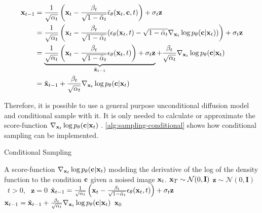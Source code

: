 \begin{equation}
   \begin{aligned}
      \mathbf{x}_{t-1} &= \frac{1}{\sqrt{\alpha_t}} \left(\mathbf{x}_t - \frac{\beta_t}{\sqrt{1 - \bar{\alpha}_t}} \bar{\epsilon}_\theta(\mathbf{x}_t, \mathbf{c}, t) \right) + \sigma_t \mathbf{z} \\
      &= \frac{1}{\sqrt{\alpha_t}} \left(\mathbf{x}_t - \frac{\beta_t}{\sqrt{1 - \bar{\alpha}_t}} (\epsilon_\theta(\mathbf{x}_t, t) - \sqrt{1 - \bar{\alpha}_t} \nabla_{\mathbf{x}_t} \log p_\theta(\mathbf{c}|\mathbf{x}_t)) \right) + \sigma_t \mathbf{z} \\
      &= \underbrace{\frac{1}{\sqrt{\alpha_t}} \left(\mathbf{x}_t - \frac{\beta_t}{\sqrt{1 - \bar{\alpha}_t}} \epsilon_\theta(\mathbf{x}_t, t) \right) + \sigma_t \mathbf{z}}_{\tilde{\mathbf{x}}_{t-1}} + \frac{\beta_t}{\sqrt{\alpha_t}} \nabla_{\mathbf{x}_t} \log p_\theta(\mathbf{c}|\mathbf{x}_t) \\
      &= \tilde{\mathbf{x}}_{t-1} + \frac{\beta_t}{\sqrt{\alpha_t}} \nabla_{\mathbf{x}_t} \log p_\theta(\mathbf{c}|\mathbf{x}_t) \\
   \end{aligned}
\end{equation}

Therefore, it is possible to use a general purpose unconditional diffusion model and conditional sample with it.
It is only needed to calculate or approximate the score-function $\nabla_{\mathbf{x}_t} \log p_\theta(\mathbf{c}|\mathbf{x}_t)$ \parencite{diffusion-beats-gans}.
\autoref{alg:sampling-conditional} shows how conditional sampling can be implemented.

\begin{algorithm}[htp!]
   \caption{Conditional Sampling}
   \label{alg:sampling-conditional}
   \begin{algorithmic}
      \Require A score-function $\nabla_{\mathbf{x}_t} \log p_\theta(\mathbf{c}|\mathbf{x}_t)$ modeling the derivative of the log of the density function to the condition $\mathbf{c}$ given a noised image $\mathbf{x}_t$.
      \State $\mathbf{x}_T \sim \mathcal{N}(0, \mathbf{I})$
      \State $\mathbf{z} \sim \mathcal{N}(0, \mathbf{I})$ \algorithmicif\ $t > 0$, \algorithmicelse\ $\mathbf{z} = 0$
      \State $\tilde{\mathbf{x}}_{t-1} = \frac{1}{\sqrt{\alpha_t}} \left(\mathbf{x}_t - \frac{\beta_t}{\sqrt{1 - \bar{\alpha}_t}} \epsilon_\theta(\mathbf{x}_t, t) \right) + \sigma_t \mathbf{z}$
      \State $\mathbf{x}_{t-1} = \tilde{\mathbf{x}}_{t-1} + \frac{\beta_t}{\sqrt{\alpha_t}} \nabla_{\mathbf{x}_t} \log p_\theta(\mathbf{c}|\mathbf{x}_t)$
      \EndFor
      \Return $\mathbf{x}_0$
   \end{algorithmic}
\end{algorithm}

